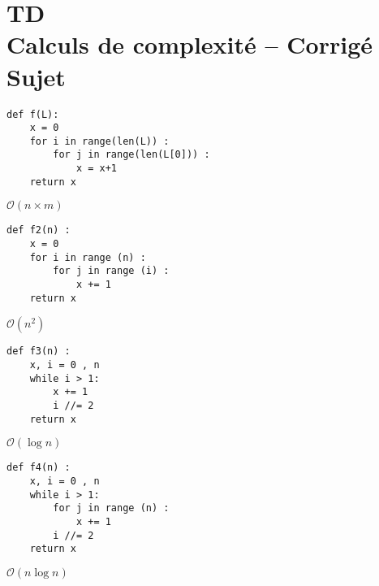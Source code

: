 \chapter*{TD  \\ 
Calculs de complexité -- 
\ifprof Corrigé \else Sujet \fi}

\iflivret {} \else
\ifprof  {} \else \fi
\fi

\setcounter{question}{0}





\begin{lstlisting}
def f(L):
    x = 0
    for i in range(len(L)) :
        for j in range(len(L[0])) :
            x = x+1
    return x
\end{lstlisting}
\ifprof
\begin{corrige}
$\mathcal{O}(n\times m)$
\end{corrige}
\else
\fi



\begin{lstlisting}
def f2(n) :
    x = 0
    for i in range (n) :
        for j in range (i) :
            x += 1
    return x
\end{lstlisting}
\ifprof
\begin{corrige}
$\mathcal{O}(n^2)$
\end{corrige}
\else
\fi



\begin{lstlisting}
def f3(n) :
    x, i = 0 , n
    while i > 1:
        x += 1
        i //= 2
    return x
\end{lstlisting}
\ifprof
\begin{corrige}
$\mathcal{O}(\log n)$
\end{corrige}
\else
\fi



\begin{lstlisting}
def f4(n) :
    x, i = 0 , n
    while i > 1:
        for j in range (n) :
            x += 1
        i //= 2
    return x
\end{lstlisting}
\ifprof
\begin{corrige}
$\mathcal{O}(n \log n)$
\end{corrige}
\else
\fi



